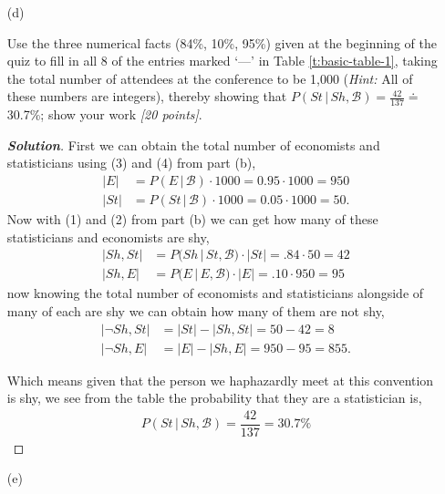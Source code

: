 \documentclass[12pt]{article}
\newcommand{\given}{\, | \,}
\newenvironment{solution}{\begin{proof}[\textbf{\textit{Solution}}] }{\end{proof}}
\begin{document}
\begin{itemize}

\item[(d)]

Use the three numerical facts (84\%, 10\%, 95\%) given at the beginning of the quiz to fill in all 8 of the entries marked `---' in Table \ref{t:basic-table-1}, taking the total number of attendees at the conference to be 1,000 (\textit{Hint:} All of these numbers are integers), thereby showing that $P ( St \given Sh, \mathcal{ B } ) = \frac{ 42 }{ 137 } \doteq$ 30.7\%; show your work \textit{[20 points]}.

\begin{solution}
    First we can obtain the total number of economists and statisticians using (3) and (4) from part (b),
    \begin{align*}
        |E| &= P(E \given \mathcal{B}) \cdot 1000 = 0.95 \cdot 1000 = 950 \\
        |St| &= P(St \given \mathcal{B}) \cdot 1000 = 0.05 \cdot 1000 = 50.
    \end{align*}
    Now with (1) and (2) from part (b) we can get how many of these statisticians and economists are shy,
    \begin{align*}
        |Sh, St| &= P(Sh \given St, \mathcal{B}) \cdot |St| = .84 \cdot 50 = 42 \\
        |Sh, E| &= P(E \given E, \mathcal{B}) \cdot |E| = .10 \cdot 950 = 95
    \end{align*}
    now knowing the total number of economists and statisticians alongside of many of each are shy we can obtain how many of them are not shy,
    \begin{align*}
        |\neg Sh, St| &= |St| - |Sh, St| = 50 - 42 = 8 \\
        |\neg Sh, E| &= |E| - |Sh, E| =  950 - 95  = 855.
    \end{align*}

    Which means given that the person we haphazardly meet at this convention is shy, we see from the table the probability that they are a statistician is,
    \begin{align*}
        P( St \given Sh, \mathcal{B}) = \dfrac{42}{137} = 30.7\%
    \end{align*}
\end{solution}

\newpage

\item[(e)]


\end{itemize}
\end{document}
